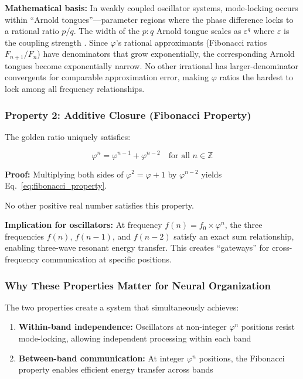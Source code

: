 \documentclass[11pt,a4paper]{article}
\newcommand{\phisym}{\varphi}
\newcommand{\fzero}{f_0}
\begin{document}
\textbf{Mathematical basis:} In weakly coupled oscillator systems, mode-locking occurs within ``Arnold tongues''---parameter regions where the phase difference locks to a rational ratio $p/q$. The width of the $p:q$ Arnold tongue scales as $\varepsilon^q$ where $\varepsilon$ is the coupling strength \citep{arnold1961, glass1988}. Since $\phisym$'s rational approximants (Fibonacci ratios $F_{n+1}/F_n$) have denominators that grow exponentially, the corresponding Arnold tongues become exponentially narrow. No other irrational has larger-denominator convergents for comparable approximation error, making $\phisym$ ratios the hardest to lock among all frequency relationships.

\subsubsection{Property 2: Additive Closure (Fibonacci Property)}

The golden ratio uniquely satisfies:

\begin{equation}
\phisym^n = \phisym^{n-1} + \phisym^{n-2} \quad \text{for all } n \in \mathbb{Z}
\label{eq:fibonacci_property}
\end{equation}

\textbf{Proof:} Multiplying both sides of $\phisym^2 = \phisym + 1$ by $\phisym^{n-2}$ yields Eq.~\ref{eq:fibonacci_property}.

No other positive real number satisfies this property.

\textbf{Implication for oscillators:} At frequency $f(n) = \fzero \times \phisym^n$, the three frequencies $f(n)$, $f(n-1)$, and $f(n-2)$ satisfy an exact sum relationship, enabling three-wave resonant energy transfer. This creates ``gateways'' for cross-frequency communication at specific positions.

\subsubsection{Why These Properties Matter for Neural Organization}

The two properties create a system that simultaneously achieves:

\begin{enumerate}
    \item \textbf{Within-band independence:} Oscillators at non-integer $\phisym^n$ positions resist mode-locking, allowing independent processing within each band
    
    \item \textbf{Between-band communication:} At integer $\phisym^n$ positions, the Fibonacci property enables efficient energy transfer across bands
\end{enumerate}
\end{document}
